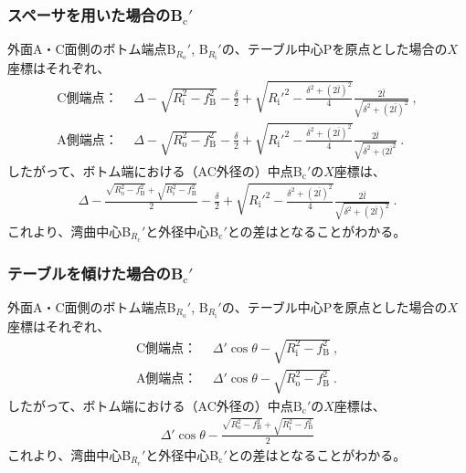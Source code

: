\subsubsection{スペーサを用いた場合のB\texorpdfstring{$_\mathrm c'$}{c'}}
外面A・C面側のボトム端点B$_{R_\mathrm o}'$, B$_{R_\mathrm i}'$の、テーブル中心Pを原点とした場合の$X$座標はそれぞれ、
\begin{align*}
  \text{C側端点：}&~~
  \varDelta-\sqrt{R_\mathrm i^2-f_\mathrm B^2}-\frac\delta2+\sqrt{R_\mathrm i'^2-\frac{\delta^2+(2\bar l)^2}4}\frac{2\bar l}{\sqrt{\delta^2+(2\bar l)^2}}\ ,\\
  \text{A側端点：}&~~
  \varDelta-\sqrt{R_\mathrm o^2-f_\mathrm B^2}-\frac\delta2+\sqrt{R_\mathrm i'^2-\frac{\delta^2+(2\bar l)^2}4}\frac{2\bar l}{\sqrt{\delta^2+(2\bar l^2}}\ .
\end{align*}
したがって、ボトム端における（AC外径の）中点B$_\mathrm c'$の$X$座標は、
\begin{align}
  \label{eq:spacerBc}
  \varDelta-\frac{\sqrt{R_\mathrm o^2-f_\mathrm B^2}+\sqrt{R_\mathrm i^2-f_\mathrm B^2}}2
  -\frac\delta2+\sqrt{R_\mathrm i'^2-\frac{\delta^2+(2\bar l)^2}4}\frac{2\bar l}{\sqrt{\delta^2+(2\bar l)^2}}\ .
\end{align}
これより、湾曲中心B$_{R_\mathrm c}'$と外径中心B$_\mathrm c'$との差はとなることがわかる。


\subsubsection{テーブルを傾けた場合のB\texorpdfstring{$_\mathrm c'$}{c'}}
外面A・C面側のボトム端点B$_{R_\mathrm o}'$, B$_{R_\mathrm i}'$の、テーブル中心Pを原点とした場合の$X$座標はそれぞれ、
\begin{subequations}
\begin{align}
  \label{eq:tableBRi}
  \text{C側端点：}&~~
  \varDelta'\cos\theta-\sqrt{R_\mathrm i^2-f_\mathrm B^2}\ ,\\
  \text{A側端点：}&~~
  \varDelta'\cos\theta-\sqrt{R_\mathrm o^2-f_\mathrm B^2}\ .
\end{align}
\end{subequations}
したがって、ボトム端における（AC外径の）中点B$_\mathrm c'$の$X$座標は、
\begin{align}
  \label{eq:tableBc}
  \varDelta'\cos\theta-\frac{\sqrt{R_\mathrm o^2-f_\mathrm B^2}+\sqrt{R_\mathrm i^2-f_\mathrm B^2}}2
\end{align}
これより、湾曲中心B$_{R_\mathrm c}'$と外径中心B$_\mathrm c'$との差はとなることがわかる。




